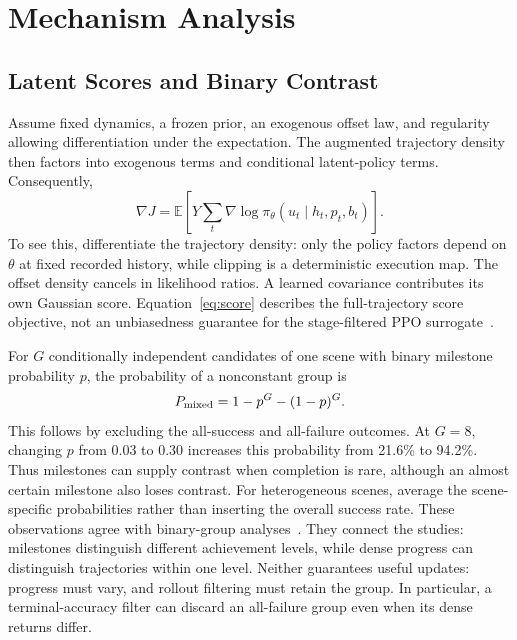 \section{Mechanism Analysis}\label{sec:theory}
\subsection{Latent Scores and Binary Contrast}
Assume fixed dynamics, a frozen prior, an exogenous offset law, and regularity allowing differentiation under the expectation. The augmented trajectory density then factors into exogenous terms and conditional latent-policy terms. Consequently,
\begin{equation}
\nabla J=\mathbb E\!\left[Y\sum_t\nabla\log\pi_\theta(u_t\mid h_t,p_t,b_t)\right].
\label{eq:score}
\end{equation}
To see this, differentiate the trajectory density: only the policy factors depend on $\theta$ at fixed recorded history, while clipping is a deterministic execution map. The offset density cancels in likelihood ratios. A learned covariance contributes its own Gaussian score. Equation~\eqref{eq:score} describes the full-trajectory score objective, not an unbiasedness guarantee for the stage-filtered PPO surrogate~\cite{capg}.

For $G$ conditionally independent candidates of one scene with binary milestone probability $p$, the probability of a nonconstant group is
\begin{equation}
P_{\rm mixed}=1-p^G-(1-p)^G.
\label{eq:mixed}
\end{equation}
This follows by excluding the all-success and all-failure outcomes. At $G=8$, changing $p$ from 0.03 to 0.30 increases this probability from 21.6\% to 94.2\%. Thus milestones can supply contrast when completion is rare, although an almost certain milestone also loses contrast. For heterogeneous scenes, average the scene-specific probabilities rather than inserting the overall success rate. These observations agree with binary-group analyses~\cite{mroueh2026,bay2026}. They connect the studies: milestones distinguish different achievement levels, while dense progress can distinguish trajectories within one level. Neither guarantees useful updates: progress must vary, and rollout filtering must retain the group. In particular, a terminal-accuracy filter can discard an all-failure group even when its dense returns differ.

